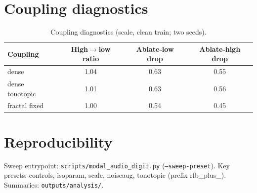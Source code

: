 \documentclass[11pt,a4paper]{article}
\begin{document}



\appendix
\section{Coupling diagnostics}
\label{app:nulls}
\begin{table}[h]
\centering
\caption{Coupling diagnostics (scale, clean train; two seeds).}
\label{tab:diag}
\small
\begin{tabular}{@{}lccc@{}}
\toprule
Coupling & High$\to$low ratio & Ablate-low drop & Ablate-high drop \\
\midrule
dense & 1.04 & 0.63 & 0.55 \\
dense tonotopic & 1.01 & 0.63 & 0.56 \\
fractal fixed & 1.00 & 0.54 & 0.45 \\
\bottomrule
\end{tabular}
\end{table}

\section{Reproducibility}
\label{app:repro}
\begin{sloppypar}
Sweep entrypoint: \texttt{scripts/modal\_audio\_digit.py}
(\texttt{--sweep-preset}).
Key presets: controls, isoparam, scale, noiseaug, tonotopic
(prefix \textsf{rfb\_plus\_}).
Summaries: \texttt{outputs/analysis/}.
\end{sloppypar}
\end{document}
